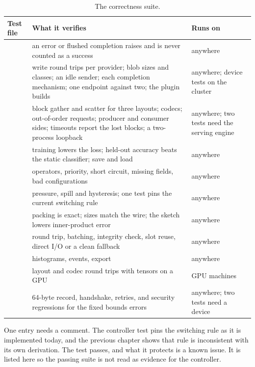 \begin{table}[htbp]
  \centering
  \caption[The correctness suite]{The correctness suite.}
  \label{tab:tests}
  \small
  \begin{tabular}{L{4.8cm}L{7.3cm}L{2.4cm}}
    \toprule
    Test file & What it verifies & Runs on \\
    \midrule
     & an error or flushed completion raises and is never counted as a success & anywhere \\
     & write round trips per provider; blob sizes and classes; an idle sender; each completion mechanism; one endpoint against two; the plugin builds & anywhere; device tests on the cluster \\
     & block gather and scatter for three layouts; codecs; out-of-order requests; producer and consumer sides; timeouts report the lost blocks; a two-process loopback & anywhere; two tests need the serving engine \\
     & training lowers the loss; held-out accuracy beats the static classifier; save and load & anywhere \\
     & operators, priority, short circuit, missing fields, bad configurations & anywhere \\
     & pressure, spill and hysteresis; one test pins the current switching rule & anywhere \\
     & packing is exact; sizes match the wire; the sketch lowers inner-product error & anywhere \\
     & round trip, batching, integrity check, slot reuse, direct I/O or a clean fallback & anywhere \\
     & histograms, events, export & anywhere \\
     & layout and codec round trips with tensors on a GPU & GPU machines \\
     & 64-byte record, handshake, retries, and security regressions for the fixed bounds errors & anywhere; two tests need a device \\
    \bottomrule
  \end{tabular}
\end{table}

One entry needs a comment. The controller test pins the switching rule as it
is implemented today, and the previous chapter shows that rule is inconsistent
with its own derivation. The test passes, and what it protects is a known
issue. It is listed here so the passing suite is not read as evidence for the
controller.

